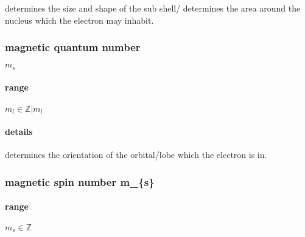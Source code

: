 \documentclass[]{article}
\let\oldparagraph\paragraph
\renewcommand{\paragraph}[1]{\oldparagraph{#1}\mbox{}}
\begin{document}
determines the size and shape of the sub shell/ determines the area
around the nucleus which the electron may inhabit.

\hypertarget{magnetic-quantum-number}{%
\subsubsection{magnetic quantum number}\label{magnetic-quantum-number}}

\(m_s\)

\hypertarget{range-1}{%
\paragraph{range}\label{range-1}}

\(m_{l} \in \mathbb{Z} | m_{l}\)

\hypertarget{details-2}{%
\paragraph{details}\label{details-2}}

determines the orientation of the orbital/lobe which the electron is in.

\hypertarget{magnetic-spin-number-m_s}{%
\subsubsection{magnetic spin number
m\_\{s\}}\label{magnetic-spin-number-m_s}}

\hypertarget{range-2}{%
\paragraph{range}\label{range-2}}

\(m_{s} \in \mathbb{Z}\)
\end{document}
